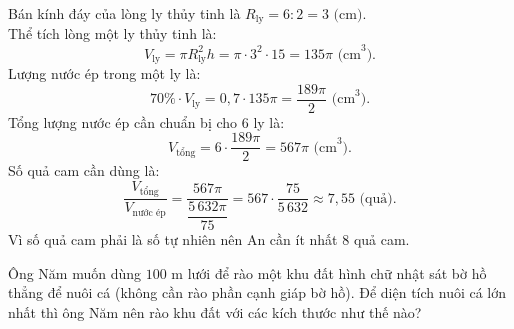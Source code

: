 \begin{bt}
{\begin{enumerate}[a)]
    Bán kính đáy của lòng ly thủy tinh là $R_{\text{ly}} = 6 : 2 = 3\text{ (cm)}$.\\
    Thể tích lòng một ly thủy tinh là:
    $$V_{\text{ly}} = \pi R_{\text{ly}}^2 h = \pi \cdot 3^2 \cdot 15 = 135\pi\text{ (cm}^3\text{)}.$$
    Lượng nước ép trong một ly là:
    $$70\% \cdot V_{\text{ly}} = 0{,}7 \cdot 135\pi = \dfrac{189\pi}{2}\text{ (cm}^3\text{)}.$$
    Tổng lượng nước ép cần chuẩn bị cho $6$ ly là:
    $$V_{\text{tổng}} = 6 \cdot \dfrac{189\pi}{2} = 567\pi\text{ (cm}^3\text{)}.$$
    Số quả cam cần dùng là:
    $$\dfrac{V_{\text{tổng}}}{V_{\text{nước ép}}} = \dfrac{567\pi}{\dfrac{5\,632\pi}{75}} = 567 \cdot \dfrac{75}{5\,632} \approx 7{,}55\text{ (quả)}.$$
    Vì số quả cam phải là số tự nhiên nên An cần ít nhất $8$ quả cam.
\end{enumerate}
}
\end{bt}

\begin{bt}%
Ông Năm muốn dùng $100\text{ m}$ lưới để rào một khu đất hình chữ nhật sát bờ hồ thẳng để nuôi cá (không cần rào phần cạnh giáp bờ hồ). Để diện tích nuôi cá lớn nhất thì ông Năm nên rào khu đất với các kích thước như thế nào?
\end{bt}

